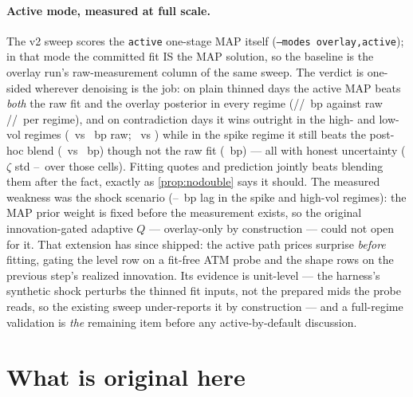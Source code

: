 \documentclass[11pt]{article}
\begin{document}
\paragraph{Active mode, measured at full scale.} The v2 sweep scores the
\texttt{active} one-stage MAP itself (\texttt{--modes overlay,active}); in
that mode the committed fit IS the MAP solution, so the baseline is the
overlay run's raw-measurement column of the same sweep. The verdict is
one-sided wherever denoising is the job: on plain thinned days the active
MAP beats \emph{both} the raw fit and the overlay posterior in every regime
(\KalActThinSpike/\KalActThinHigh/\KalActThinLow\ bp against raw
\KalErrMeasSpike/\KalErrMeasHigh/\KalErrMeasLow\ per regime), and on
contradiction days it wins outright in the high- and low-vol regimes
(\KalActContraHigh\ vs \KalRawContraHigh\ bp raw; \KalActContraLow\ vs
\KalRawContraLow) while in the spike regime it still beats the post-hoc
blend (\KalActContraSpike\ vs \KalOvlContraSpike\ bp) though not the raw fit
(\KalRawContraSpike\ bp) --- all with honest uncertainty ($\zeta$ std
\KalActZetaMin--\KalActZetaMax\ over those cells). Fitting quotes and
prediction jointly beats blending them after the fact, exactly as
\cref{prop:nodouble} says it should. The measured weakness was the shock
scenario (\KalActShockSpike--\KalActShockHigh\ bp lag in the spike and
high-vol regimes): the MAP prior weight is fixed before the measurement
exists, so the original innovation-gated adaptive $Q$ --- overlay-only by
construction --- could not open for it. That extension has since shipped:
the active path prices surprise \emph{before} fitting, gating the level
row on a fit-free ATM probe and the shape rows on the previous step's
realized innovation.  Its evidence is unit-level --- the harness's
synthetic shock perturbs the thinned fit inputs, not the prepared mids
the probe reads, so the existing sweep under-reports it by construction
--- and a full-regime validation is \emph{the} remaining item before any
active-by-default discussion.

\section{What is original here}
\label{sec:original}
\end{document}
